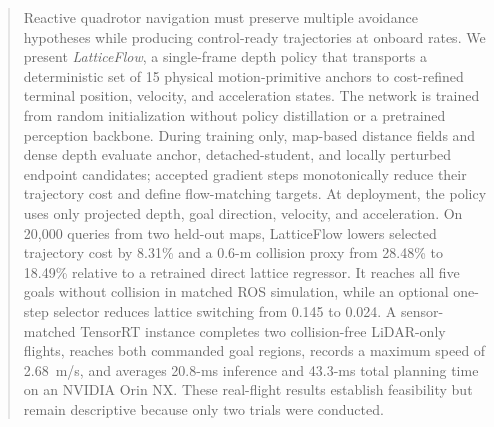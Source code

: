 \begin{abstract}
Reactive quadrotor navigation must preserve multiple avoidance hypotheses while producing control-ready trajectories at onboard rates. We present \emph{LatticeFlow}, a single-frame depth policy that transports a deterministic set of 15 physical motion-primitive anchors to cost-refined terminal position, velocity, and acceleration states. The network is trained from random initialization without policy distillation or a pretrained perception backbone. During training only, map-based distance fields and dense depth evaluate anchor, detached-student, and locally perturbed endpoint candidates; accepted gradient steps monotonically reduce their trajectory cost and define flow-matching targets. At deployment, the policy uses only projected depth, goal direction, velocity, and acceleration. On 20,000 queries from two held-out maps, LatticeFlow lowers selected trajectory cost by 8.31\% and a 0.6-m collision proxy from 28.48\% to 18.49\% relative to a retrained direct lattice regressor. It reaches all five goals without collision in matched ROS simulation, while an optional one-step selector reduces lattice switching from 0.145 to 0.024. A sensor-matched TensorRT instance completes two collision-free LiDAR-only flights, reaches both commanded goal regions, records a maximum speed of 2.68~m/s, and averages 20.8-ms inference and 43.3-ms total planning time on an NVIDIA Orin NX. These real-flight results establish feasibility but remain descriptive because only two trials were conducted.
\end{abstract}
